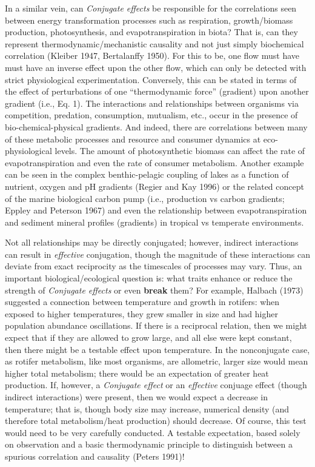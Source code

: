 \documentclass[11pt,letterpaper,]{paper}
\begin{document}
In a similar vein, can \emph{Conjugate effects} be responsible for the
correlations seen between energy transformation processes such as
respiration, growth/biomass production, photosynthesis, and
evapotranspiration in biota? That is, can they represent
thermodynamic/mechanistic causality and not just simply biochemical
correlation (Kleiber 1947, Bertalanffy 1950). For this to be, one flow
must have must have an inverse effect upon the other flow, which can
only be detected with strict physiological experimentation. Conversely,
this can be stated in terms of the effect of perturbations of one
``thermodynamic force'' (gradient) upon another gradient (i.e., Eq. 1).
The interactions and relationships between organisms via competition,
predation, consumption, mutualism, etc., occur in the presence of
bio-chemical-physical gradients. And indeed, there are correlations
between many of these metabolic processes and resource and consumer
dynamics at eco-physiological levels. The amount of photosynthetic
biomass can affect the rate of evapotranspiration and even the rate of
consumer metabolism. Another example can be seen in the complex
benthic-pelagic coupling of lakes as a function of nutrient, oxygen and
pH gradients (Regier and Kay 1996) or the related concept of the marine
biological carbon pump (i.e., production vs carbon gradients; Eppley and
Peterson 1967) and even the relationship between evapotranspiration and
sediment mineral profiles (gradients) in tropical vs temperate
environments.

Not all relationships may be directly conjugated; however, indirect
interactions can result in \emph{effective} conjugation, though the
magnitude of these interactions can deviate from exact reciprocity as
the timescales of processes may vary. Thus, an important
biological/ecological question is: what traits enhance or reduce the
strength of \emph{Conjugate effects} or even \textbf{break} them? For
example, Halbach (1973) suggested a connection between temperature and
growth in rotifers: when exposed to higher temperatures, they grew
smaller in size and had higher population abundance oscillations. If
there is a reciprocal relation, then we might expect that if they are
allowed to grow large, and all else were kept constant, then there might
be a testable effect upon temperature. In the nonconjugate case, as
rotifer metabolism, like most organisms, are allometric, larger size
would mean higher total metabolism; there would be an expectation of
greater heat production. If, however, a \emph{Conjugate effect} or an
\emph{effective} conjuage effect (though indirect interactions) were
present, then we would expect a decrease in temperature; that is, though
body size may increase, numerical density (and therefore total
metabolism/heat production) should decrease. Of course, this test would
need to be very carefully conducted. A testable expectation, based
solely on observation and a basic thermodynamic principle to distinguish
between a spurious correlation and causality (Peters 1991)!
\end{document}
